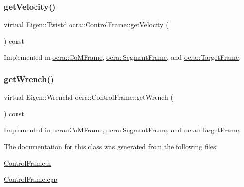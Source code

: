 \subsubsection{\texorpdfstring{get\+Velocity()}{getVelocity()}}
{\footnotesize\ttfamily virtual Eigen\+::\+Twistd ocra\+::\+Control\+Frame\+::get\+Velocity (\begin{DoxyParamCaption}{ }\end{DoxyParamCaption}) const\hspace{0.3cm}{\ttfamily [pure virtual]}}



Implemented in \hyperlink{classocra_1_1CoMFrame_a02be3e73c64903d67b1e7ada25c468c5}{ocra\+::\+Co\+M\+Frame}, \hyperlink{classocra_1_1SegmentFrame_a6a45d4901408704ead9bbd1f5b99a666}{ocra\+::\+Segment\+Frame}, and \hyperlink{classocra_1_1TargetFrame_a5eeda88210d7002c3c73ba949139ed5b}{ocra\+::\+Target\+Frame}.

\hypertarget{classocra_1_1ControlFrame_a069aaf1eab98598fbffee263fcde0c56}{}\label{classocra_1_1ControlFrame_a069aaf1eab98598fbffee263fcde0c56} 
\subsubsection{\texorpdfstring{get\+Wrench()}{getWrench()}}
{\footnotesize\ttfamily virtual Eigen\+::\+Wrenchd ocra\+::\+Control\+Frame\+::get\+Wrench (\begin{DoxyParamCaption}{ }\end{DoxyParamCaption}) const\hspace{0.3cm}{\ttfamily [pure virtual]}}



Implemented in \hyperlink{classocra_1_1CoMFrame_a8e00462bbe13df6f595b7000d44240c6}{ocra\+::\+Co\+M\+Frame}, \hyperlink{classocra_1_1SegmentFrame_a47bebcb9817083395ab034fe8fb72a19}{ocra\+::\+Segment\+Frame}, and \hyperlink{classocra_1_1TargetFrame_a5e9ccc5e2e5ae8e52a37b5810a76115d}{ocra\+::\+Target\+Frame}.



The documentation for this class was generated from the following files\+:\begin{DoxyCompactItemize}
\item 
\hyperlink{ControlFrame_8h}{Control\+Frame.\+h}\item 
\hyperlink{ControlFrame_8cpp}{Control\+Frame.\+cpp}\end{DoxyCompactItemize}
